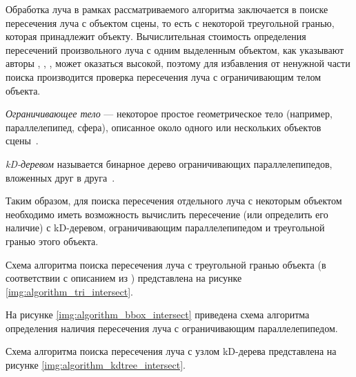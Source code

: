 Обработка луча в рамках рассматриваемого алгоритма заключается в поиске пересечения луча с объектом сцены, то есть с некоторой треугольной гранью, которая принадлежит объекту.
Вычислительная стоимость определения пересечений произвольного луча с одним выделенным объектом, как указывают авторы \cite{божко2007компьютерная}, \cite{роджерс}, \cite{боресков}, может оказаться высокой, поэтому для избавления от ненужной части поиска производится проверка пересечения луча с ограничивающим телом объекта.

\textit{Ограничивающее тело} --- некоторое простое геометрическое тело (например, параллелепипед, сфера), описанное около одного или нескольких объектов сцены~\cite{боресков}.

\textit{kD-деревом} называется бинарное дерево ограничивающих параллелепипедов, вложенных друг в друга~\cite{боресков}.
	
Таким образом, для поиска пересечения отдельного луча с некоторым объектом необходимо иметь возможность вычислить пересечение (или определить его наличие) с kD-деревом, ограничивающим параллелепипедом и треугольной гранью этого объекта.

Схема алгоритма поиска пересечения луча с треугольной гранью объекта (в соответствии с описанием из \cite{moller2005fast}) представлена на рисунке \ref{img:algorithm_tri_intersect}.


\clearpage


На рисунке \ref{img:algorithm_bbox_intersect} приведена схема алгоритма определения наличия пересечения луча с ограничивающим параллелепипедом.


\clearpage

Схема алгоритма поиска пересечения луча с узлом kD-дерева представлена на рисунке \ref{img:algorithm_kdtree_intersect}.


\clearpage

